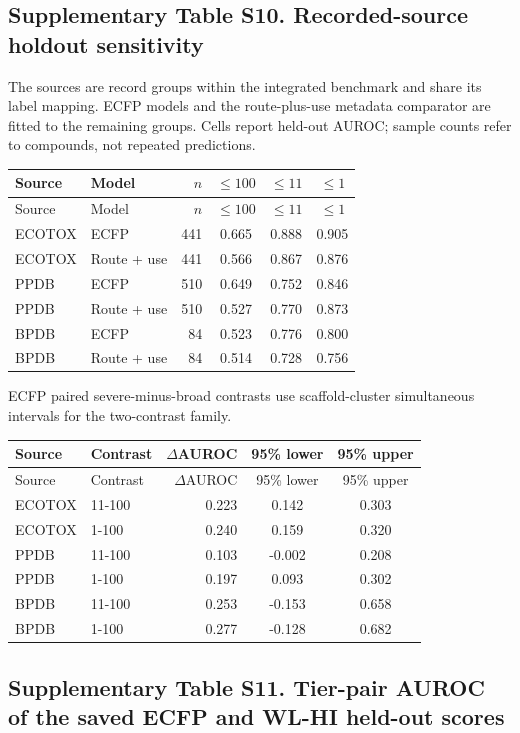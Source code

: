 \subsection*{Supplementary Table S10. Recorded-source holdout sensitivity}
The sources are record groups within the integrated benchmark and share its label mapping. ECFP models and the route-plus-use metadata comparator are fitted to the remaining groups. Cells report held-out AUROC; sample counts refer to compounds, not repeated predictions.
\begingroup\small\setlength{\tabcolsep}{4pt}
\begin{longtable}{llrccc}
\toprule Source & Model & $n$ & $\leq100$ & $\leq11$ & $\leq1$ \\ \midrule\endfirsthead
\toprule Source & Model & $n$ & $\leq100$ & $\leq11$ & $\leq1$ \\ \midrule\endhead
\bottomrule\endlastfoot
ECOTOX & ECFP & 441 & 0.665 & 0.888 & 0.905 \\
ECOTOX & Route + use & 441 & 0.566 & 0.867 & 0.876 \\
PPDB & ECFP & 510 & 0.649 & 0.752 & 0.846 \\
PPDB & Route + use & 510 & 0.527 & 0.770 & 0.873 \\
BPDB & ECFP & 84 & 0.523 & 0.776 & 0.800 \\
BPDB & Route + use & 84 & 0.514 & 0.728 & 0.756 \\
\end{longtable}
ECFP paired severe-minus-broad contrasts use scaffold-cluster simultaneous intervals for the two-contrast family.
\begin{longtable}{llrcc}
\toprule Source & Contrast & $\Delta$AUROC & 95\% lower & 95\% upper \\ \midrule\endfirsthead
\toprule Source & Contrast & $\Delta$AUROC & 95\% lower & 95\% upper \\ \midrule\endhead
\bottomrule\endlastfoot
ECOTOX & 11-100 & 0.223 & 0.142 & 0.303 \\
ECOTOX & 1-100 & 0.240 & 0.159 & 0.320 \\
PPDB & 11-100 & 0.103 & -0.002 & 0.208 \\
PPDB & 1-100 & 0.197 & 0.093 & 0.302 \\
BPDB & 11-100 & 0.253 & -0.153 & 0.658 \\
BPDB & 1-100 & 0.277 & -0.128 & 0.682 \\
\end{longtable}\endgroup

\subsection*{Supplementary Table S11. Tier-pair AUROC of the saved ECFP and WL-HI held-out scores}

